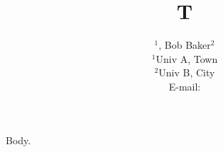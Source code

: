 \documentclass{PoS}
\title{T}
\author{\speaker{Ann Able}$^{1}$, Bob Baker$^{2}$\\ $^{1}$Univ A, Town\\ $^{2}$Univ B, City\\ E-mail: \email{ann@a.edu}}
\begin{document}
\maketitle
Body.
\end{document}
